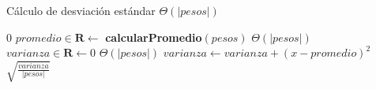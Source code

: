 \begin{algorithm}[H]
	\caption{Cálculo de desviación estándar \Comment $\Theta(|pesos|)$}
	\begin{algorithmic}[1]
		\State \Return $0$
		\EndIf
		\Statex
		\State $promedio \in \mathbf{R} \gets $ \textbf{calcularPromedio}$(pesos)$ \Comment $\Theta(|pesos|)$
		\State $varianza \in \mathbf{R} \gets 0$
		\Statex
		 \Comment $\Theta(|pesos|)$
		\State $varianza \gets varianza + (x - promedio)^2$
		\EndFor
		\Statex
		\State \Return $\sqrt{\frac{varianza}{|pesos|}}$
		\EndFunction
	\end{algorithmic}
\end{algorithm}